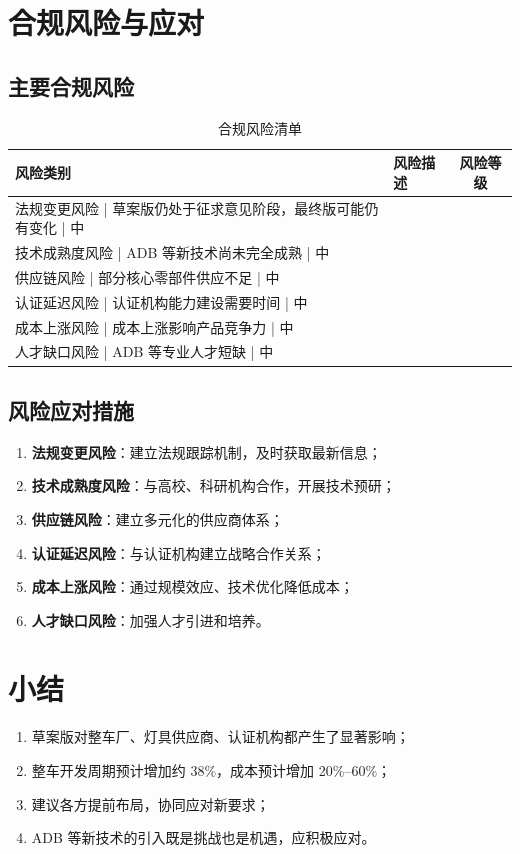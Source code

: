 \section{合规风险与应对}

\subsection{主要合规风险}

\begin{table}[H]
\centering
\caption{合规风险清单}
\small
\begin{tabularx}{\textwidth}{|l|X|c|}
\hline
\textbf{风险类别} & \textbf{风险描述} & \textbf{风险等级} \\
\hline
法规变更风险   | 草案版仍处于征求意见阶段，最终版可能仍有变化 | 中 \\
\hline
技术成熟度风险  | ADB 等新技术尚未完全成熟      | 中 \\
\hline
供应链风险     | 部分核心零部件供应不足        | 中 \\
\hline
认证延迟风险   | 认证机构能力建设需要时间      | 中 \\
\hline
成本上涨风险   | 成本上涨影响产品竞争力        | 中 \\
\hline
人才缺口风险   | ADB 等专业人才短缺          | 中 \\
\hline
\end{tabularx}
\end{table}

\subsection{风险应对措施}

\begin{enumerate}[leftmargin=2em]
    \item \textbf{法规变更风险}：建立法规跟踪机制，及时获取最新信息；
    \item \textbf{技术成熟度风险}：与高校、科研机构合作，开展技术预研；
    \item \textbf{供应链风险}：建立多元化的供应商体系；
    \item \textbf{认证延迟风险}：与认证机构建立战略合作关系；
    \item \textbf{成本上涨风险}：通过规模效应、技术优化降低成本；
    \item \textbf{人才缺口风险}：加强人才引进和培养。
\end{enumerate}

\section{小结}

\begin{enumerate}[leftmargin=2em]
    \item 草案版对整车厂、灯具供应商、认证机构都产生了显著影响；
    \item 整车开发周期预计增加约 38\%，成本预计增加 20\%--60\%；
    \item 建议各方提前布局，协同应对新要求；
    \item ADB 等新技术的引入既是挑战也是机遇，应积极应对。
\end{enumerate}